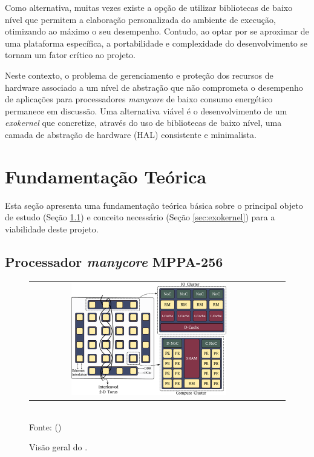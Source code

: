 \documentclass[
	12pt,				%
	openright,			%
	twoside,			%
	a4paper,			%
	english,			%
	brazil,				%
	]{abntex2}
\begin{document}
    Como alternativa, muitas vezes existe a opção de utilizar bibliotecas
    de baixo nível que permitem a elaboração personalizada do ambiente de
    execução, otimizando ao máximo o seu desempenho. Contudo, ao optar por se
    aproximar de uma plataforma específica, a portabilidade e complexidade do
    desenvolvimento se tornam um fator crítico ao projeto.
    
    Neste contexto, o problema de gerenciamento e proteção dos recursos de
    hardware associado a um nível de abstração que não comprometa o desempenho
    de aplicações para processadores \textit{manycore} de baixo consumo
    energético permanece em discussão.
    Uma alternativa viável é o desenvolvimento de um \textit{exokernel} que
    concretize, através do uso de bibliotecas de baixo nível, uma camada de
    abstração de hardware (HAL) consistente e minimalista.

\chapter{Fundamentação Teórica}
\label{sec:fundamentacao}

    Esta seção apresenta uma fundamentação teórica básica sobre o
    principal objeto de estudo (Seção \ref{sec:mppa}) e conceito necessário
    (Seção \ref{sec:exokernel}) para a viabilidade deste projeto.

    \section{Processador \textit{manycore} MPPA-256}
    \label{sec:mppa}
    
        \begin{figure}[h]
            \begin{center}
                \caption{Visão geral do \mppa.}
                    \label{figmppa}
                \begin{tabular}{ccc}
                    \includegraphics[width=0.67\textwidth]{figs/mppa-overview.pdf}\\
                \end{tabular}
                \vspace{1ex} \\
                Fonte: ()
            \end{center}
            \vspace{-2ex}
        \end{figure}
    
\end{document}
